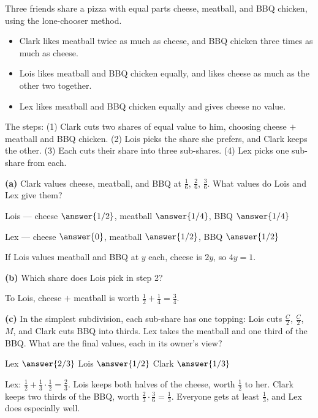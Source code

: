 \documentclass[12pt]{ximera}
\begin{document}
\begin{problem}
Three friends share a pizza with equal parts cheese, meatball, and BBQ chicken, using
the lone-chooser method.
\begin{itemize}
\item Clark likes meatball twice as much as cheese, and BBQ chicken three times as much
      as cheese.
\item Lois likes meatball and BBQ chicken equally, and likes cheese as much as the
      other two together.
\item Lex likes meatball and BBQ chicken equally and gives cheese no value.
\end{itemize}
The steps: (1) Clark cuts two shares of equal value to him, choosing cheese $+$ meatball
and BBQ chicken. (2) Lois picks the share she prefers, and Clark keeps the other. (3)
Each cuts their share into three sub-shares. (4) Lex picks one sub-share from each.

\begin{prompt}
\textbf{(a)} Clark values cheese, meatball, and BBQ at $\frac16$, $\frac26$, $\frac36$.
What values do Lois and Lex give them?

Lois --- cheese $\answer{1/2}$, meatball $\answer{1/4}$, BBQ $\answer{1/4}$

\smallskip
Lex --- cheese $\answer{0}$, meatball $\answer{1/2}$, BBQ $\answer{1/2}$
\begin{feedback}
If Lois values meatball and BBQ at $y$ each, cheese is $2y$, so $4y=1$.
\end{feedback}
\end{prompt}

\begin{prompt}
\textbf{(b)} Which share does Lois pick in step 2?
\begin{multipleChoice}
\end{multipleChoice}
\begin{feedback}
To Lois, cheese $+$ meatball is worth $\frac12+\frac14=\frac34$.
\end{feedback}
\end{prompt}

\begin{prompt}
\textbf{(c)} In the simplest subdivision, each sub-share has one topping: Lois cuts
$\frac C2$, $\frac C2$, $M$, and Clark cuts BBQ into thirds. Lex takes the meatball
and one third of the BBQ. What are the final values, each in its owner's view?

Lex $\answer{2/3}$ \quad Lois $\answer{1/2}$ \quad Clark $\answer{1/3}$
\begin{feedback}
Lex: $\frac12+\frac13\cdot\frac12=\frac23$. Lois keeps both halves of the cheese, worth
$\frac12$ to her. Clark keeps two thirds of the BBQ, worth $\frac23\cdot\frac36=\frac13$.
Everyone gets at least $\frac13$, and Lex does especially well.
\end{feedback}
\end{prompt}
\end{problem}
\end{document}
